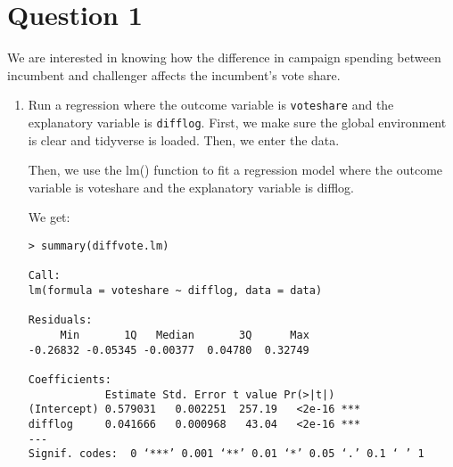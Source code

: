 \documentclass[12pt,letterpaper]{article}
\begin{document}
\section*{Question 1}
\vspace{.25cm}
\noindent We are interested in knowing how the difference in campaign spending between incumbent and challenger affects the incumbent's vote share. 
	\begin{enumerate}
		\item Run a regression where the outcome variable is \texttt{voteshare} and the explanatory variable is \texttt{difflog}.	\vspace{5cm}
\noindent First, we make sure the global environment is clear and tidyverse is loaded. Then, we enter the data.
\vspace{.5cm}
  
\vspace{.5cm}   
\noindent Then, we use the lm() function to fit a regression model where the outcome variable is voteshare and the explanatory variable is difflog.
\vspace{.5cm}
  
\vspace{.5cm}    
\noindent We get:
\begin{verbatim}
> summary(diffvote.lm)

Call:
lm(formula = voteshare ~ difflog, data = data)

Residuals:
     Min       1Q   Median       3Q      Max 
-0.26832 -0.05345 -0.00377  0.04780  0.32749 

Coefficients:
            Estimate Std. Error t value Pr(>|t|)    
(Intercept) 0.579031   0.002251  257.19   <2e-16 ***
difflog     0.041666   0.000968   43.04   <2e-16 ***
---
Signif. codes:  0 ‘***’ 0.001 ‘**’ 0.01 ‘*’ 0.05 ‘.’ 0.1 ‘ ’ 1


\end{verbatim}
\end{enumerate}
\end{document}
